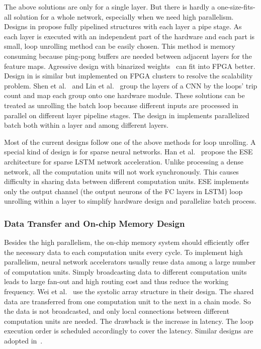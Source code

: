 The above solutions are only for a single layer. But there is hardly a one-size-fits-all solution for a whole network, especially when we need high parallelism. Designs in \cite{li2016high, liu2016automatic, zhang2018dnnbuilder} propose fully pipelined structures with each layer a pipe stage. As each layer is executed with an independent part of the hardware and each part is small, loop unrolling method can be easily chosen. This method is memory consuming because ping-pong buffers are needed between adjacent layers for the feature maps. Agressive design with binarized weights~\cite{yang2018fully} can fit into FPGA better. Design in \cite{zhang2016energy} is similar but implemented on FPGA clusters to resolve the scalability problem. Shen et al.~\cite{shen2016overcoming} and Lin et al.~\cite{lin2018lcp} group the layers of a CNN by the loops' trip count and map each group onto one hardware module. These solutions can be treated as unrolling the batch loop because different inputs are processed in parallel on different layer pipeline stages. The design in \cite{lu2017evaluating} implements parallelized batch both within a layer and among different layers. 

Most of the current designs follow one of the above methods for loop unrolling. A special kind of design is for sparse neural networks. Han et al.~\cite{han2017ese} propose the ESE architecture for sparse LSTM network acceleration. Unlike processing a dense network, all the computation units will not work synchronously. This causes difficulty in sharing data between different computation units. ESE implements only the output channel (the output neurons of the FC layers in LSTM) loop unrolling within a layer to simplify hardware design and parallelize batch process.

\subsubsection{Data Transfer and On-chip Memory Design}

Besides the high parallelism, the on-chip memory system should efficiently offer the necessary data to each computation units every cycle. To implement high parallelism, neural network accelerators usually reuse data among a large number of computation units. Simply broadcasting data to different computation units leads to large fan-out and high routing cost and thus reduce the working frequency. Wei et al.~\cite{wei2017automated} use the systolic array structure in their design. The shared data are transferred from one computation unit to the next in a chain mode. So the data is not broadcasted, and only local connections between different computation units are needed. The drawback is the increase in latency. The loop execution order is scheduled accordingly to cover the latency. Similar designs are adopted in~\cite{aydonat2017opencl, ma2017optimizing}. 

